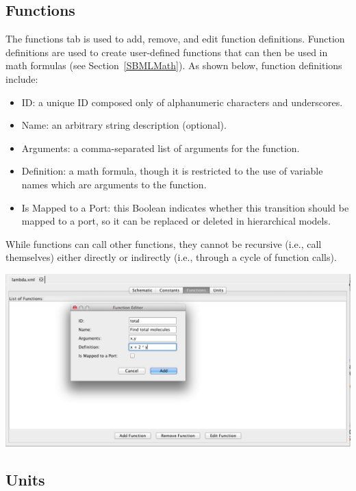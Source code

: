 \documentclass[titlepage,11pt]{article}
\begin{document}
\clearpage

\subsection{\label{Functions}Functions}

\noindent
The functions tab is used to add, remove, and edit function definitions. Function definitions are used to create user-defined functions that can then be used in math formulas (see Section~\ref{SBMLMath}).  As shown below, function definitions include:
\begin{itemize}
\item ID: a unique ID composed only of alphanumeric characters and underscores.
\item Name: an arbitrary string description (optional).
\item Arguments: a comma-separated list of arguments for the function.
\item Definition: a math formula, though it is restricted to the use of variable names which are arguments to the function.
\item Is Mapped to a Port: this Boolean indicates whether this transition should be mapped to a port, so it can be replaced or deleted in hierarchical models.
\end{itemize}
While functions can call other functions, they cannot be recursive (i.e., call themselves) either directly or indirectly (i.e., through a cycle of function calls).  

\begin{center}
\includegraphics[width=160mm]{screenshots/function}
\end{center}

\clearpage

\subsection{\label{Units}Units}
\end{document}
